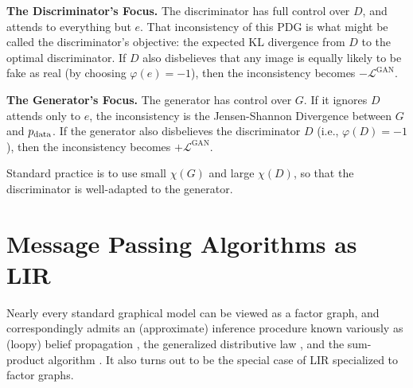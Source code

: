 \textbf{The Discriminator's Focus.}
The discriminator has full control over $D$, and attends to
everything but $e$.
That inconsistency of this PDG is what might be called
the discriminator's objective:
the expected KL divergence from $D$ to the optimal discriminator.
If $D$ also disbelieves that any image is equally likely to be fake as real
(by choosing $\varphi(e) = -1$),
then the inconsistency becomes $-\mathcal L^{\text{GAN}}$.

\textbf{The Generator's Focus.}
The generator has control over $G$.
If it ignores $D$ attends only to $e$, the inconsistency
is the Jensen-Shannon Divergence between $G$ and $p_{\mathrm{data}}$.
If the generator also disbelieves the discriminator $D$
(i.e., $ \varphi(D) =-1$),
then the inconsistency becomes $+\mathcal L^{\text{GAN}}$.

Standard practice is to use small $\chi(G)$ and large $\chi(D)$,
so that the discriminator is well-adapted to the generator.

\section{Message Passing Algorithms as LIR}

Nearly every standard graphical model can be viewed
    as a factor graph, and correspondingly admits an
    (approximate) inference procedure known
    variously as (loopy) belief propagation \cite{koller2009probabilistic},
    the generalized distributive law \cite{aji2000gendistriblaw},
    and the sum-product algorithm \cite{kschischang2001factor}.
It also turns out to be the special case of LIR specialized to factor graphs.

